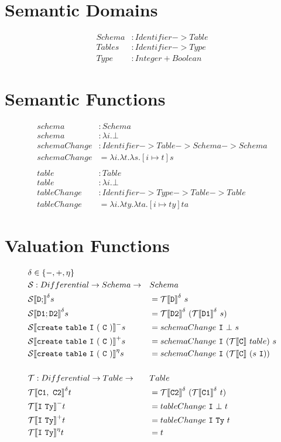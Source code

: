 \documentclass[12pt]{article}
\newcommand{\cmp}[2]{
  \mathcal{#1}|[ \mathtt{ \StrSubstitute{#2}{ }{\ } } |]
}
\begin{document}
\section{Semantic Domains}
\begin{align*}
  Schema &: Identifier -> Table \\
  Tables &: Identifier -> Type \\
  Type &: Integer + Boolean
\end{align*}

\section{Semantic Functions}
\begin{align*}
  schema &: Schema \\
  schema &: \lambda i.\bot \\
  schemaChange &: Identifier -> Table -> Schema -> Schema \\
  schemaChange &= \lambda i. \lambda t. \lambda s. [ i \mapsto t ]s \\
  \\
  table &: Table \\
  table &: \lambda i.\bot \\
  tableChange &: Identifier -> Type -> Table -> Table \\
  tableChange &= \lambda i. \lambda ty. \lambda ta. [ i \mapsto ty ]ta
\end{align*}

\newpage

\section{Valuation Functions}

\begin{alignat*}{2}
  &\delta \in \{-, +, \eta \} &&\\
  &\mathcal{S} : Differential -> Schema -> &&Schema \\
  &\cmp{S}{D;}^{\delta}s &&= \cmp{T}{D}^{\delta}\ s \\
  &\cmp{S}{D1;D2}^{\delta}s &&= \cmp{T}{D2}^{\delta}\ (\cmp{T}{D1}^{\delta}\ s) \\
  &\cmp{S}{create table I ( C )}^{-}s &&= schemaChange\ \mathtt{I}\ \bot\ s\\
  &\cmp{S}{create table I ( C )}^{+}s &&= schemaChange\ \mathtt{I}\ (\cmp{T}{C}\ table) \ s \\
  &\cmp{S}{create table I ( C )}^{\eta}s &&= schemaChange\ \mathtt{I}\ (\cmp{T}{C}\ (s\ \mathtt{I})) \\
\\
  &\mathcal{T} : Differential -> Table ->&& Table\\
  &\cmp{T}{C1, C2}^{\delta}t &&= \cmp{T}{C2}^{\delta}\ (\cmp{T}{C1}^{\delta}\ t) \\
  &\cmp{T}{I Ty}^{-}t &&= tableChange\ \mathtt{I}\ \bot\ t\\
  &\cmp{T}{I Ty}^{+}t &&= tableChange\ \mathtt{I}\ \mathtt{Ty}\ t\\
  &\cmp{T}{I Ty}^{\eta}t &&= t \\
\end{alignat*}
\end{document}
